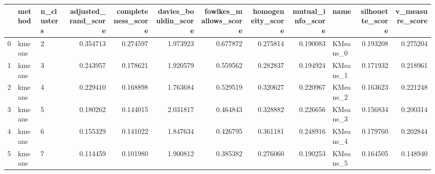 \begin{tabular}{lllrrrrrrlrr}
\toprule
{} &  method & n\_clusters &  adjusted\_rand\_score &  completeness\_score &  davies\_bouldin\_score &  fowlkes\_mallows\_score &  homogeneity\_score &  mutual\_info\_score &      name &  silhouette\_score &  v\_measure\_score \\
\midrule
0 &  kmeans &          2 &             0.354713 &            0.274597 &              1.973923 &               0.677872 &           0.275814 &           0.190083 &  KMeans\_0 &          0.193208 &         0.275204 \\
1 &  kmeans &          3 &             0.243957 &            0.178621 &              1.920579 &               0.559562 &           0.282837 &           0.194924 &  KMeans\_1 &          0.171932 &         0.218961 \\
2 &  kmeans &          4 &             0.229410 &            0.168898 &              1.763684 &               0.529519 &           0.320627 &           0.220967 &  KMeans\_2 &          0.163623 &         0.221248 \\
3 &  kmeans &          5 &             0.180262 &            0.144015 &              2.031817 &               0.464843 &           0.328882 &           0.226656 &  KMeans\_3 &          0.156834 &         0.200314 \\
4 &  kmeans &          6 &             0.155329 &            0.141022 &              1.847634 &               0.426795 &           0.361181 &           0.248916 &  KMeans\_4 &          0.179760 &         0.202844 \\
5 &  kmeans &          7 &             0.114459 &            0.101980 &              1.900812 &               0.385382 &           0.276060 &           0.190253 &  KMeans\_5 &          0.164505 &         0.148940 \\
\bottomrule
\end{tabular}

